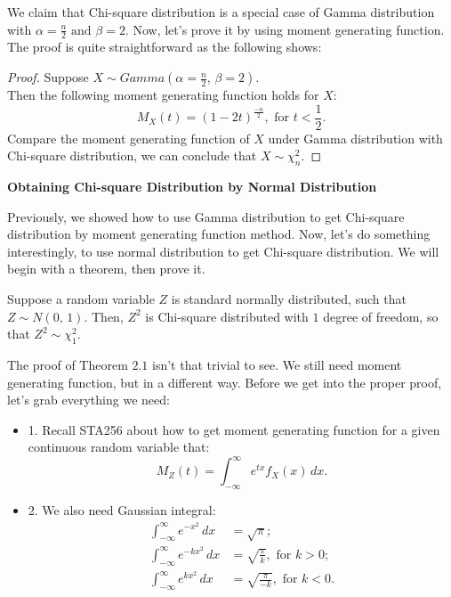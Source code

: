 \noindent
We claim that Chi-square distribution is a special case of Gamma distribution with $\alpha = \frac{n}{2} \text{ and } \beta = 2$. Now, let's prove it by using moment generating function.\\

\noindent
The proof is quite straightforward as the following shows:

\begin{proof} Suppose $X \sim Gamma( \alpha = \frac{n}{2} \text{, } \beta = 2).$ \\
Then the following moment generating function holds for $X$: \[ M_{X}(t) = (1- 2t)^{\frac{-n}{2}}, \text{ for $t < \frac{1}{2}$}.\]
Compare the moment generating function of $X$ under Gamma distribution with Chi-square distribution, we can conclude that $X \sim \chi_{n}^{2}$.
\end{proof}

\noindent
\textbf{Obtaining Chi-square Distribution by Normal Distribution}

\noindent
Previously, we showed how to use Gamma distribution to get Chi-square distribution by moment generating function method. Now, let's do something interestingly, to use normal distribution to get Chi-square distribution. We will begin with a theorem, then prove it.

\begin{thm}
Suppose a random variable $Z$ is standard normally distributed, such that $Z \sim N(0 \text{, }1).$ Then, $Z^2$ is Chi-square distributed with $1$ degree of freedom, so that $Z^2 \sim \chi_{1}^{2}$.
\end{thm}

\noindent
The proof of Theorem $2.1$ isn't that trivial to see. We still need moment generating function, but in a different way. Before we get into the proper proof, let's grab everything we need:

\begin{itemize}
	\item 1. Recall STA256 about how to get moment generating function for a given continuous random variable that: \[ M_{Z}(t) = \int_{-\infty}^{\infty} e^{tx}f_{X}(x)\,dx.\]
	\item 2. We also need Gaussian integral:
		\begin{align}
    			\int_{-\infty}^{\infty} e^{-x^2}\,dx &= \sqrt{\pi}; \label{eq:gaussian1} \\
    			\int_{-\infty}^{\infty} e^{-kx^2}\,dx &= \sqrt{\frac{\pi}{k}}, \text{ for $k > 0$}; \label{eq:gaussian2} \\
    			\int_{-\infty}^{\infty} e^{kx^2}\,dx &= \sqrt{\frac{\pi}{-k}}, \text{ for $k < 0$}. \label{eq:gaussian3}
		\end{align}
\end{itemize}

